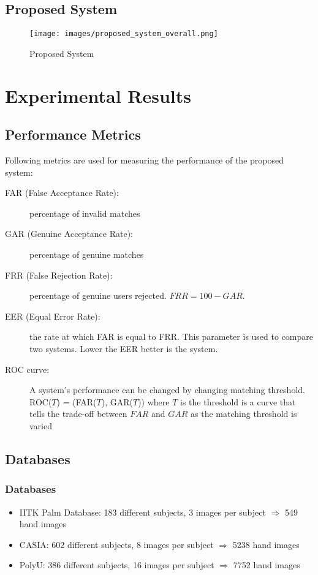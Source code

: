 \documentclass{beamer}
\begin{document}
\subsection*{Proposed System}
\begin{frame}
\begin{figure}[htp]
\begin{center}
\texttt{[image: images/proposed\_system\_overall.png]}
\caption{Proposed System\label{proposed_system_overall} }
\end{center}
\end{figure}
\end{frame}

\section{Experimental Results}
\subsection{Performance Metrics}
\begin{frame}
Following metrics are used for measuring the performance of the proposed system:
\begin{description}
  \item [FAR (False Acceptance Rate): ]percentage of invalid matches
  \item [GAR (Genuine Acceptance Rate): ]percentage of genuine matches
  \item [FRR (False Rejection Rate): ]percentage of genuine users rejected. $FRR = 100 - GAR$.
  \item [EER (Equal Error Rate): ]the rate at which FAR is equal to FRR. This parameter is used to compare two systems. Lower the EER better is the system.
  \item [ROC curve: ]A system's performance can be changed by changing matching threshold. ROC($T$) = (FAR($T$), GAR($T$)) where $T$ is the threshold is a 
curve that tells the trade-off between $FAR$ and $GAR$ as the matching threshold is varied
\end{description}
\end{frame}


\subsection{Databases}
\begin{frame}
\frametitle{Databases}
\begin{itemize}
  \item IITK Palm Database: 183 different subjects, 3 images per subject $\Rightarrow$ 549 hand images
  \item CASIA: 602 different subjects, 8 images per subject $\Rightarrow$ 5238 hand images
  \item PolyU: 386 different subjects, 16 images per subject $\Rightarrow$ 7752 hand images
\end{itemize}
\end{frame}
\end{document}
